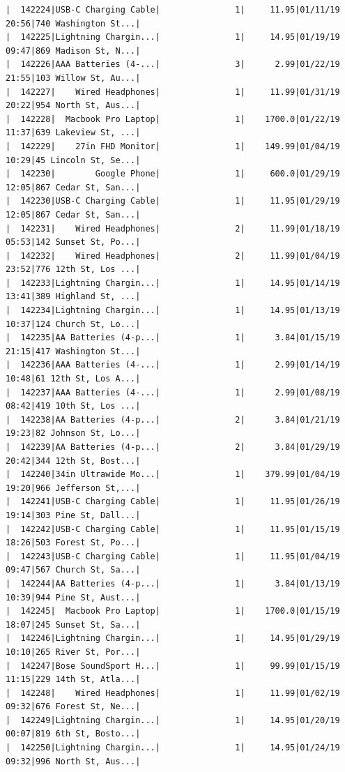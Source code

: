 \documentclass[
  letterpaper,
  DIV=11,
  numbers=noendperiod]{scrartcl}
\begin{document}
\begin{verbatim}
|  142224|USB-C Charging Cable|               1|     11.95|01/11/19 20:56|740 Washington St...|
|  142225|Lightning Chargin...|               1|     14.95|01/19/19 09:47|869 Madison St, N...|
|  142226|AAA Batteries (4-...|               3|      2.99|01/22/19 21:55|103 Willow St, Au...|
|  142227|    Wired Headphones|               1|     11.99|01/31/19 20:22|954 North St, Aus...|
|  142228|  Macbook Pro Laptop|               1|    1700.0|01/22/19 11:37|639 Lakeview St, ...|
|  142229|    27in FHD Monitor|               1|    149.99|01/04/19 10:29|45 Lincoln St, Se...|
|  142230|        Google Phone|               1|     600.0|01/29/19 12:05|867 Cedar St, San...|
|  142230|USB-C Charging Cable|               1|     11.95|01/29/19 12:05|867 Cedar St, San...|
|  142231|    Wired Headphones|               2|     11.99|01/18/19 05:53|142 Sunset St, Po...|
|  142232|    Wired Headphones|               2|     11.99|01/04/19 23:52|776 12th St, Los ...|
|  142233|Lightning Chargin...|               1|     14.95|01/14/19 13:41|389 Highland St, ...|
|  142234|Lightning Chargin...|               1|     14.95|01/13/19 10:37|124 Church St, Lo...|
|  142235|AA Batteries (4-p...|               1|      3.84|01/15/19 21:15|417 Washington St...|
|  142236|AAA Batteries (4-...|               1|      2.99|01/14/19 10:48|61 12th St, Los A...|
|  142237|AAA Batteries (4-...|               1|      2.99|01/08/19 08:42|419 10th St, Los ...|
|  142238|AA Batteries (4-p...|               2|      3.84|01/21/19 19:23|82 Johnson St, Lo...|
|  142239|AA Batteries (4-p...|               2|      3.84|01/29/19 20:42|344 12th St, Bost...|
|  142240|34in Ultrawide Mo...|               1|    379.99|01/04/19 19:20|966 Jefferson St,...|
|  142241|USB-C Charging Cable|               1|     11.95|01/26/19 19:14|303 Pine St, Dall...|
|  142242|USB-C Charging Cable|               1|     11.95|01/15/19 18:26|503 Forest St, Po...|
|  142243|USB-C Charging Cable|               1|     11.95|01/04/19 09:47|567 Church St, Sa...|
|  142244|AA Batteries (4-p...|               1|      3.84|01/13/19 10:39|944 Pine St, Aust...|
|  142245|  Macbook Pro Laptop|               1|    1700.0|01/15/19 18:07|245 Sunset St, Sa...|
|  142246|Lightning Chargin...|               1|     14.95|01/29/19 10:10|265 River St, Por...|
|  142247|Bose SoundSport H...|               1|     99.99|01/15/19 11:15|229 14th St, Atla...|
|  142248|    Wired Headphones|               1|     11.99|01/02/19 09:32|676 Forest St, Ne...|
|  142249|Lightning Chargin...|               1|     14.95|01/20/19 00:07|819 6th St, Bosto...|
|  142250|Lightning Chargin...|               1|     14.95|01/24/19 09:32|996 North St, Aus...|

\end{verbatim}
\end{document}
